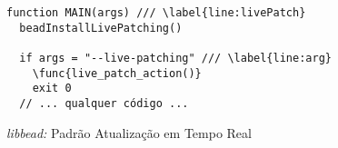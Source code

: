 \begin{pseudocode}
\begin{lstlisting}[language=pseudocode, style=pseudocode]
function MAIN(args) /// \label{line:livePatch}
  beadInstallLivePatching()

  if args = "--live-patching" /// \label{line:arg}
    \func{live_patch_action()}
    exit 0
  // ... qualquer código ...
\end{lstlisting}

  \caption{\emph{libbead:} Padrão Atualização em Tempo Real}
  \label{alg:beadLivePatch}
\end{pseudocode}
